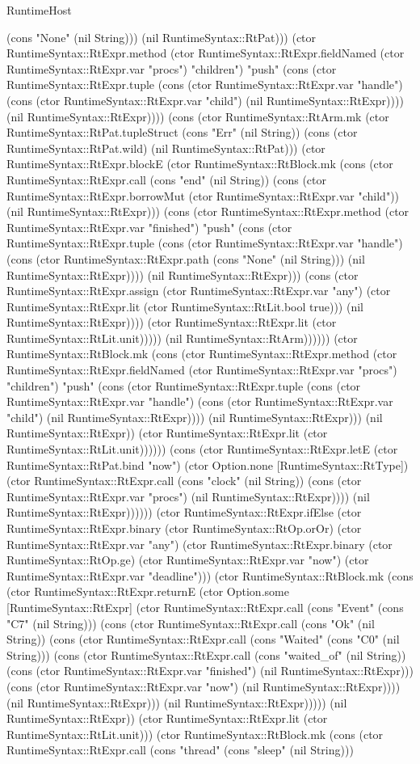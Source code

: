 \begin{lexlean}{RuntimeHost}
\begin{semanticmodule}
{(cons "None" (nil String))) (nil RuntimeSyntax::RtPat))) (ctor RuntimeSyntax::RtExpr.method (ctor RuntimeSyntax::RtExpr.fieldNamed (ctor RuntimeSyntax::RtExpr.var "procs") "children") "push" (cons (ctor RuntimeSyntax::RtExpr.tuple (cons (ctor RuntimeSyntax::RtExpr.var "handle") (cons (ctor RuntimeSyntax::RtExpr.var "child") (nil RuntimeSyntax::RtExpr)))) (nil RuntimeSyntax::RtExpr)))) (cons (ctor RuntimeSyntax::RtArm.mk (ctor RuntimeSyntax::RtPat.tupleStruct (cons "Err" (nil String)) (cons (ctor RuntimeSyntax::RtPat.wild) (nil RuntimeSyntax::RtPat))) (ctor RuntimeSyntax::RtExpr.blockE (ctor RuntimeSyntax::RtBlock.mk (cons (ctor RuntimeSyntax::RtExpr.call (cons "end" (nil String)) (cons (ctor RuntimeSyntax::RtExpr.borrowMut (ctor RuntimeSyntax::RtExpr.var "child")) (nil RuntimeSyntax::RtExpr))) (cons (ctor RuntimeSyntax::RtExpr.method (ctor RuntimeSyntax::RtExpr.var "finished") "push" (cons (ctor RuntimeSyntax::RtExpr.tuple (cons (ctor RuntimeSyntax::RtExpr.var "handle") (cons (ctor RuntimeSyntax::RtExpr.path (cons "None" (nil String))) (nil RuntimeSyntax::RtExpr)))) (nil RuntimeSyntax::RtExpr))) (cons (ctor RuntimeSyntax::RtExpr.assign (ctor RuntimeSyntax::RtExpr.var "any") (ctor RuntimeSyntax::RtExpr.lit (ctor RuntimeSyntax::RtLit.bool true))) (nil RuntimeSyntax::RtExpr)))) (ctor RuntimeSyntax::RtExpr.lit (ctor RuntimeSyntax::RtLit.unit))))) (nil RuntimeSyntax::RtArm)))))) (ctor RuntimeSyntax::RtBlock.mk (cons (ctor RuntimeSyntax::RtExpr.method (ctor RuntimeSyntax::RtExpr.fieldNamed (ctor RuntimeSyntax::RtExpr.var "procs") "children") "push" (cons (ctor RuntimeSyntax::RtExpr.tuple (cons (ctor RuntimeSyntax::RtExpr.var "handle") (cons (ctor RuntimeSyntax::RtExpr.var "child") (nil RuntimeSyntax::RtExpr)))) (nil RuntimeSyntax::RtExpr))) (nil RuntimeSyntax::RtExpr)) (ctor RuntimeSyntax::RtExpr.lit (ctor RuntimeSyntax::RtLit.unit)))))) (cons (ctor RuntimeSyntax::RtExpr.letE (ctor RuntimeSyntax::RtPat.bind "now") (ctor Option.none [RuntimeSyntax::RtType]) (ctor RuntimeSyntax::RtExpr.call (cons "clock" (nil String)) (cons (ctor RuntimeSyntax::RtExpr.var "procs") (nil RuntimeSyntax::RtExpr)))) (nil RuntimeSyntax::RtExpr)))))) (ctor RuntimeSyntax::RtExpr.ifElse (ctor RuntimeSyntax::RtExpr.binary (ctor RuntimeSyntax::RtOp.orOr) (ctor RuntimeSyntax::RtExpr.var "any") (ctor RuntimeSyntax::RtExpr.binary (ctor RuntimeSyntax::RtOp.ge) (ctor RuntimeSyntax::RtExpr.var "now") (ctor RuntimeSyntax::RtExpr.var "deadline"))) (ctor RuntimeSyntax::RtBlock.mk (cons (ctor RuntimeSyntax::RtExpr.returnE (ctor Option.some [RuntimeSyntax::RtExpr] (ctor RuntimeSyntax::RtExpr.call (cons "Event" (cons "C7" (nil String))) (cons (ctor RuntimeSyntax::RtExpr.call (cons "Ok" (nil String)) (cons (ctor RuntimeSyntax::RtExpr.call (cons "Waited" (cons "C0" (nil String))) (cons (ctor RuntimeSyntax::RtExpr.call (cons "waited_of" (nil String)) (cons (ctor RuntimeSyntax::RtExpr.var "finished") (nil RuntimeSyntax::RtExpr))) (cons (ctor RuntimeSyntax::RtExpr.var "now") (nil RuntimeSyntax::RtExpr)))) (nil RuntimeSyntax::RtExpr))) (nil RuntimeSyntax::RtExpr))))) (nil RuntimeSyntax::RtExpr)) (ctor RuntimeSyntax::RtExpr.lit (ctor RuntimeSyntax::RtLit.unit))) (ctor RuntimeSyntax::RtBlock.mk (cons (ctor RuntimeSyntax::RtExpr.call (cons "thread" (cons "sleep" (nil String))) }
\end{semanticmodule}
\end{lexlean}

